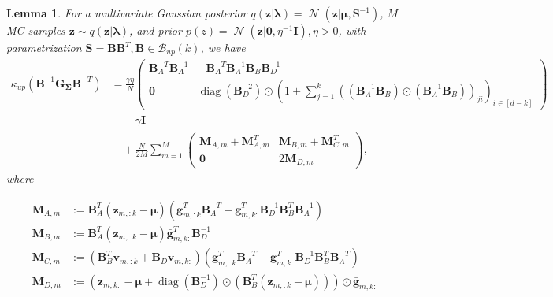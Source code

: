 \documentclass[a4paper, 11pt, oneside]{scrartcl}
\theoremstyle{break}
\newtheorem{lemma}{Lemma}[section]
\DeclareMathOperator{\Normal}{\mathcal{N}}
\DeclareMathOperator{\diag}{diag}
\newcommand{\matr}[1]{\boldsymbol{#1}}
\newcommand{\set}[1]{\mathcal{#1}}
\numberwithin{equation}{section}
\begin{document}
					\begin{lemma}
						For a multivariate Gaussian posterior $q(\matr{z} | \matr{\lambda}) = \Normal(\matr{z} | \matr{\mu}, \matr{S}^{-1})$, $M$ MC samples $\matr{z} \sim q(\matr{z} | \matr{\lambda})$, and prior $p(z) = \Normal(\matr{z} | \matr{0}, \eta^{-1} \matr{I}), \eta > 0$, with parametrization $\matr{S} = \matr{B} \matr{B}^T, \matr{B} \in \set{B}_{up}(k)$, we have
						\begin{align*}
							\kappa_{up}(\matr{B}^{-1} \matr{G_{\Sigma}} \matr{B}^{-T}) &= \frac{\gamma \eta}{N}\begin{pmatrix} \matr{B}_A^{-T} \matr{B}_A^{-1} & -\matr{B}_A^{-T} \matr{B}_A^{-1} \matr{B}_B \matr{B}_D^{-1} \\ \matr{0} & \diag(\matr{B}_D^{-2}) \odot (1 + \sum_{j=1}^k ((\matr{B}_A^{-1} \matr{B}_B) \odot (\matr{B}_A^{-1} \matr{B}_B))_{ji})_{i \in [d-k]} \end{pmatrix} \\
							&\quad - \gamma \matr{I} \\
							&\quad + \frac{N}{2 M} \sum_{m=1}^M \begin{pmatrix} \matr{M}_{A, m} + \matr{M}_{A, m}^T & \matr{M}_{B, m} + \matr{M}_{C, m}^T \\ \matr{0} & 2\matr{M}_{D, m} \end{pmatrix},
						\end{align*}
						where 

						\begin{align*}
							\matr{M}_{A, m} &:= \matr{B}_A^T (\matr{z}_{m, :k} - \matr{\mu}) (\matr{\bar{g}}_{m, :k}^T \matr{B}_A^{-T} - \matr{\bar{g}}_{m, k:}^T \matr{B}_D^{-1} \matr{B}_B^T \matr{B}_A^{-1} ) \\
							\matr{M}_{B, m} &:= \matr{B}_A^T (\matr{z}_{m, :k} - \matr{\mu}) \matr{\bar{g}}_{m, k:}^T \matr{B}_D^{-1} \\
							\matr{M}_{C, m} &:= (\matr{B}_B^T \matr{v}_{m, :k} + \matr{B}_D \matr{v}_{m, k:}) (\matr{\bar{g}}_{m, :k}^T \matr{B}_A^{-T} - \matr{\bar{g}}_{m, k:}^T \matr{B}_D^{-1} \matr{B}_B^T \matr{B}_A^{-T}) \\
							\matr{M}_{D, m} &:= (\matr{z}_{m, k:} - \matr{\mu} + \diag(\matr{B}_D^{-1}) \odot (\matr{B}_B^T (\matr{z}_{m, :k} - \matr{\mu}))) \odot \matr{\bar{g}}_{m, k:}
						\end{align*}
						\label{lemma:kappa_up}
					\end{lemma}
\end{document}
